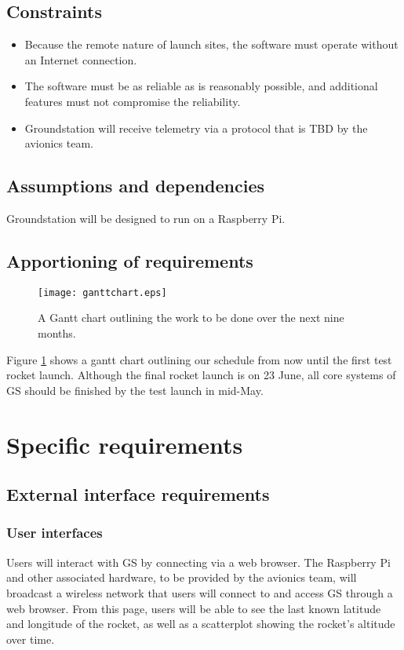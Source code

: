 \documentclass[10pt,draftclsnofoot,onecolumn]{IEEEtran}
\begin{document}
	\subsection{Constraints}
	\begin{itemize}
		\item Because the remote nature of launch sites, the software must operate without an Internet connection.
		\item The software must be as reliable as is reasonably possible, and additional features must not compromise the reliability.
		\item Groundstation will receive telemetry via a protocol that is TBD by the avionics team.
	\end{itemize}
	\subsection{Assumptions and dependencies}
	Groundstation will be designed to run on a Raspberry Pi.
	
	\subsection{Apportioning of requirements}
	
	\begin{figure}
		\texttt{[image: ganttchart.eps]}
		\caption{A Gantt chart outlining the work to be done over the next nine months.}
		\label{fig:gantt}
	\end{figure}
	
	Figure \ref{fig:gantt} shows a gantt chart outlining our schedule from now until the first test rocket launch.
	Although the final rocket launch is on 23 June, all core systems of GS should be finished by the test launch in mid-May.
		
	\section{Specific requirements}
	
	\subsection{External interface requirements}
	\subsubsection{User interfaces}
	Users will interact with GS by connecting via a web browser. The Raspberry Pi and other associated hardware,
	to be provided by the avionics team,
	will broadcast a wireless network that users will connect to and access GS through a web browser.
	From this page, users will be able to see the last known latitude and longitude of the rocket,
	as well as a scatterplot showing the rocket's altitude over time.
	
\end{document}
